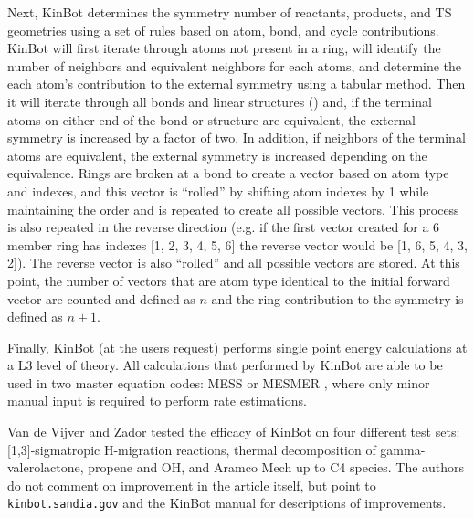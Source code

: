 \documentclass[preprint, 11pt]{elsarticle} %
\begin{document}
Next, KinBot determines the symmetry number of reactants, products, and TS geometries using a set of rules based on atom, bond, and cycle contributions.
KinBot will first iterate through atoms not present in a ring, will identify the number of neighbors and equivalent neighbors for each atoms, and determine the each atom's contribution to the external symmetry using a tabular method.
Then it will iterate through all bonds and linear structures () and, if the terminal atoms on either end of the bond or structure are equivalent, the external symmetry is increased by a factor of two.
In addition, if neighbors of the terminal atoms are equivalent, the external symmetry is increased depending on the equivalence.
Rings are broken at a bond to create a vector based on atom type and indexes, and this vector is ``rolled'' by shifting atom indexes by 1 while maintaining the order and is repeated to create all possible vectors.
This process is also repeated in the reverse direction (e.g. if the first vector created for a 6 member ring has indexes [1, 2, 3, 4, 5, 6] the reverse vector would be [1, 6, 5, 4, 3, 2]).
The reverse vector is also ``rolled'' and all possible vectors are stored.
At this point, the number of vectors that are atom type identical to the initial forward vector are counted and defined as $n$ and the ring contribution to the symmetry is defined as $n+1$. 

Finally, KinBot (at the users request) performs single point energy calculations at a L3 level of theory.
All calculations that performed by KinBot are able to be used in two master equation codes: MESS \cite{MESS:2013} or MESMER \cite{MESMER:2012}, where only minor manual input is required to perform rate estimations.

Van de Vijver and Zador tested the efficacy of KinBot on four different test sets: [1,3]-sigmatropic H-migration reactions, thermal decomposition of gamma-valerolactone, propene and OH, and Aramco Mech up to C4 species.
The authors do not comment on improvement in the article itself, but point to \texttt{kinbot.sandia.gov} and the KinBot manual for descriptions of improvements.

\end{document}
